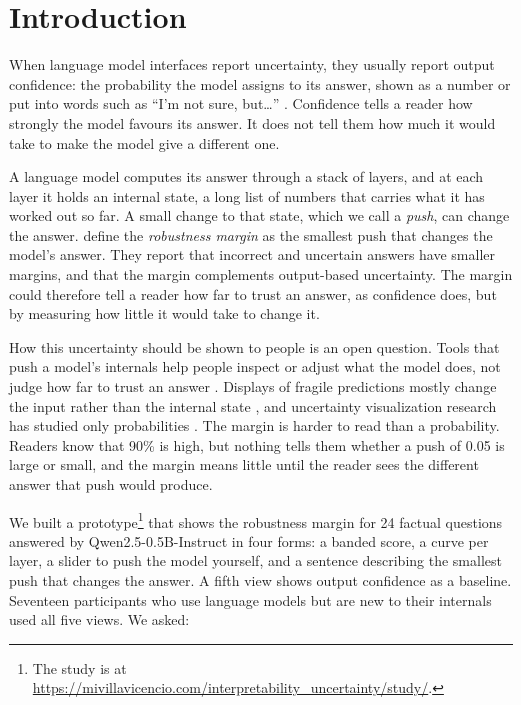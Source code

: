 \documentclass[sigconf]{acmart}
\begin{document}
\maketitle


\section{Introduction}

When language model interfaces report uncertainty, they usually report output confidence: the probability the
model assigns to its answer, shown as a number or put into words such as ``I'm not sure, but\ldots''
\cite{kimImNotSure2024, warrenWhenShouldTrust2026}. Confidence tells a reader how strongly the model favours its
answer. It does not tell them how much it would take to make the model give a different one.

A language model computes its answer through a stack of layers, and at each layer it holds an internal state, a
long list of numbers that carries what it has worked out so far. A small change to that state, which we call a
\emph{push}, can change the answer. \citet{komanduriMeasuringMechanisticUncertainty2026} define the
\emph{robustness margin} as the smallest push that changes the model's answer. They report that incorrect and
uncertain answers have smaller margins, and that the margin complements output-based uncertainty. The margin
could therefore tell a reader how far to trust an answer, as confidence does, but by measuring how little it
would take to change it.

How this uncertainty should be shown to people is an open question. Tools that push a model's internals help
people inspect or adjust what the model does, not judge how far to trust an answer
\cite{gevaLMDebuggerInteractiveTool2022, boSteerableChatbotsExploring2025}. Displays of fragile predictions mostly
change the input rather than the internal state \cite{dasBluffInteractivelyDeciphering2020, youPandaNotPanda2023},
and uncertainty visualization research has studied only probabilities
\cite{kayWhenIshMy2016, correllValueSuppressingUncertaintyPalettes2018}. The margin is harder to read than a
probability. Readers know that 90\% is high, but nothing tells them whether a push of 0.05 is large or small, and
the margin means little until the reader sees the different answer that push would produce.

We built a prototype\footnote{The study is at \url{https://mivillavicencio.com/interpretability_uncertainty/study/}.} that shows the robustness margin for 24 factual questions answered by
Qwen2.5-0.5B-Instruct in four forms: a banded score, a curve per layer, a slider to push the model yourself, and
a sentence describing the smallest push that changes the answer. A fifth view shows output confidence as a
baseline. Seventeen participants who use language models but are new to their internals used all five views.
We asked:
\end{document}
